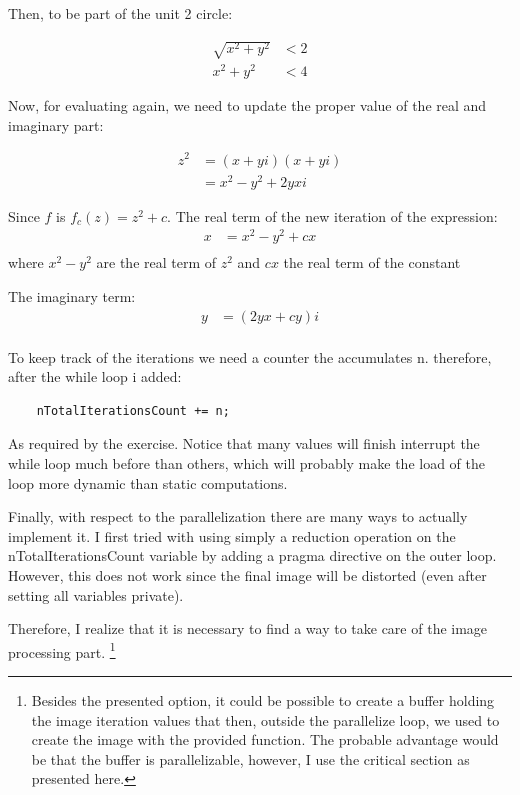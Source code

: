 \documentclass[unicode,11pt,a4paper,oneside,numbers=endperiod,openany]{scrartcl}
\begin{document}
Then, to be part of the unit 2 circle:

\begin{align*}
    \sqrt{x^2 + y^2} &< 2 \\
x^2 + y^2 &< 4
\end{align*} 

Now, for evaluating again, we need to update the proper value of the real and imaginary part:

\begin{align*}
    z^2 &= (x + yi)(x + yi) \\
    &= x^2 - y^2 + 2yxi 
\end{align*} 

Since $f$ is $f_c(z) = z^2 + c$. 
The real term of the new iteration of the expression:
\begin{align*}
    x &= x^2 - y^2 + cx \\
\end{align*} 
where $x^2 - y^2$ are the real term of $z^2$ and $cx$ the real term of the constant

The imaginary term: 
\begin{align*}
    y &=  (2yx + cy)i \\
\end{align*}

To keep track of the iterations we need a counter the accumulates n. therefore, after the while loop i added: 

\begin{lstlisting}
    nTotalIterationsCount += n;
\end{lstlisting}

As required by the exercise. Notice that many values will finish interrupt the while loop much before than others, 
which will probably make the load of the loop more dynamic than static computations.

Finally, with respect to the parallelization there are many ways to actually implement it. 
I first tried with using simply a reduction operation on the nTotalIterationsCount variable by 
adding a pragma directive on the outer loop. However, this does not work since the final image will be distorted
(even after setting all variables private). 

Therefore, I realize that it is necessary to find a way to take care of the image processing part. 
\footnote{Besides the presented option, it could be possible to create a buffer holding the image 
iteration values that then, outside the parallelize loop, we used to create the image with the provided 
function. The probable advantage would be that the buffer is parallelizable, however, I use the critical section
as presented here. }
\end{document}
